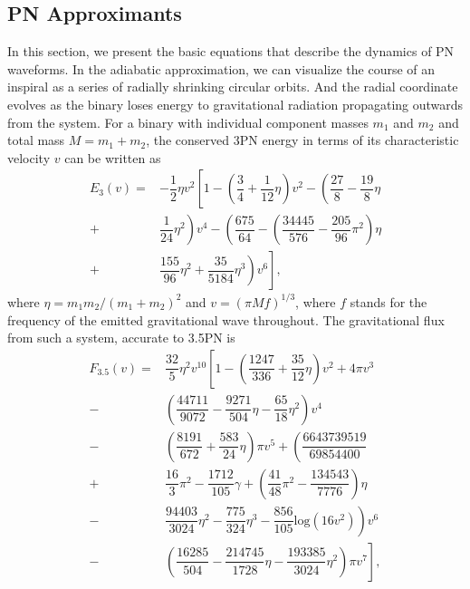 \documentclass[aps,
prd,
amsmath,
amssymb,
twocolumn,
floatfix,
groupedaddress]{revtex4-1}
\def\l({\left(}
\def\r){\right)}
\begin{document}
\subsection{PN Approximants}\label{sec:level2:PNApproximants}
In this section, we present the basic equations that describe the dynamics of PN waveforms. 
In the adiabatic approximation, we can visualize the course of an inspiral as a series of radially shrinking circular orbits. 
And the radial coordinate evolves as the binary loses energy to gravitational radiation propagating outwards from the system.
For a binary with individual component masses $m_1$ and $m_2$ and total mass $M=m_1+m_2$, the conserved 3PN energy in terms of
its characteristic velocity $v$ can be written as
\begin{equation}
\begin{split}\label{eq:E3PN}
E_3(v)=&-\dfrac{1}{2}\eta v^2 \left[1- \l(\dfrac{3}{4}+\dfrac{1}{12}\eta\r)v^2 - \l(\dfrac{27}{8}-\dfrac{19}{8}\eta\right.\right.\\
+&\left.\left.\dfrac{1}{24}\eta^2 \r)v^4 - \l(\dfrac{675}{64}-\l(\dfrac{34445}{576}-\dfrac{205}{96}\pi^2\r)\eta\right.\right.\\
+&\left.\left.\dfrac{155}{96}\eta^2 +\dfrac{35}{5184}\eta^3\r) v^6\right],
\end{split}
\end{equation}
where $\eta=m_1m_2/(m_1+m_2)^2$ and $v=(\pi Mf)^{1/3}$, where $f$ stands for the frequency of the emitted gravitational wave throughout.
The gravitational flux from such a system, accurate to 3.5PN \citep{FluxandE3-5PN} is
\begin{equation}
\begin{split}\label{eq:Ft3.5PN}
F_{3.5}(v)=&\dfrac{32}{5}\eta^2 v^{10}\left[1 - \l(\dfrac{1247}{336}+\dfrac{35}{12}\eta\r)v^2+4\pi v^3\right.\\
-&\left.\l(\dfrac{44711}{9072}-\dfrac{9271}{504}\eta -\dfrac{65}{18}\eta^2 \r)v^4\right.\\
-&\left.\l(\dfrac{8191}{672}+\dfrac{583}{24}\eta\r)\pi v^5+ \l(\dfrac{6643739519}{69854400}\right.\right.\\
+&\left.\left.\dfrac{16}{3}\pi^2 -\dfrac{1712}{105}\gamma +\l(\dfrac{41}{48}\pi^2 -\dfrac{134543}{7776}\r)\eta \right.\right.\\
-&\left.\left.\dfrac{94403}{3024}\eta^2 -\dfrac{775}{324}\eta^3 -\dfrac{856}{105}\textrm{log}(16v^2)\r)v^6\right.\\ 
-&\left.\l(\dfrac{16285}{504}-\dfrac{214745}{1728}\eta -\dfrac{193385}{3024}\eta^2 \r)\pi v^7\right],
\end{split}
\end{equation}
\end{document}
